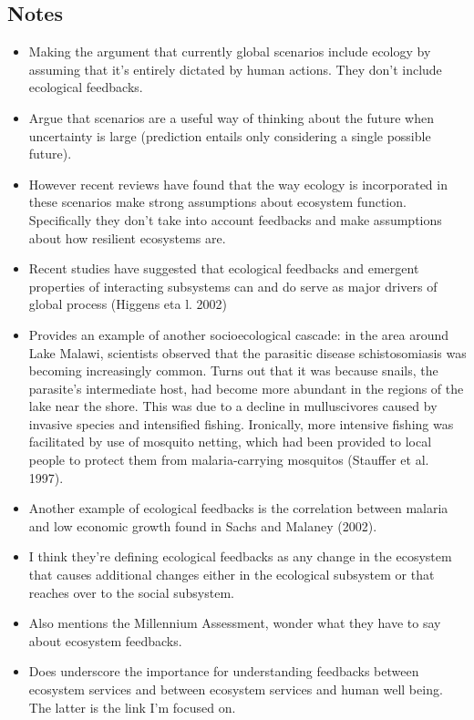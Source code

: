 \documentclass[a4paper,10pt]{report}
\begin{document}
\subsection*{Notes}
\begin{itemize}
\item Making the argument that currently global scenarios include ecology by assuming that it's entirely dictated by human actions. They don't include ecological feedbacks. 
\item Argue that scenarios are a useful way of thinking about the future when uncertainty is large (prediction entails only considering a single possible future). 
\item However recent reviews have found that the way ecology is incorporated in these scenarios make strong assumptions about ecosystem function. Specifically they don't take into account feedbacks and make assumptions about how resilient ecosystems are. 
\item Recent studies have suggested that ecological feedbacks and emergent properties of interacting subsystems can and do serve as major drivers of global process (Higgens eta l. 2002)
\item Provides an example of another socioecological cascade: in the area around Lake Malawi, scientists observed that the parasitic disease schistosomiasis was becoming increasingly common. Turns out that it was because snails, the parasite's intermediate host, had become more abundant in the regions of the lake near the shore. This was due to a decline in mulluscivores caused by invasive species and intensified fishing. Ironically, more intensive fishing was facilitated by use of mosquito netting, which had been provided to local people to protect them from malaria-carrying mosquitos (Stauffer et al. 1997). 
\item Another example of ecological feedbacks is the correlation between malaria and low economic growth found in Sachs and Malaney (2002). 
\item I think they're defining ecological feedbacks as any change in the ecosystem that causes additional changes either in the ecological subsystem or that reaches over to the social subsystem. 
\item Also mentions the Millennium Assessment, wonder what they have to say about ecosystem feedbacks. 
\item Does underscore the importance for understanding feedbacks between ecosystem services and between ecosystem services and human well being. The latter is the link I'm focused on. 
\end{itemize}
\end{document}

